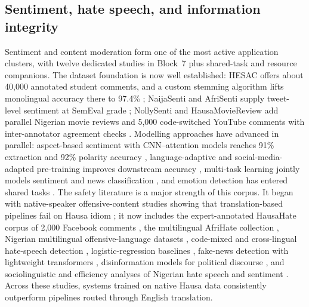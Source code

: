 \documentclass[sn-basic,pdflatex]{sn-jnl}
\begin{document}
\subsection{Sentiment, hate speech, and information integrity}
Sentiment and content moderation form one of the most active application clusters, with twelve dedicated studies in Block~7 plus shared-task and resource companions. The dataset foundation is now well established: HESAC offers about 40{,}000 annotated student comments, and a custom stemming algorithm lifts monolingual accuracy there to 97.4\% \citep{p054}; NaijaSenti and AfriSenti supply tweet-level sentiment at SemEval grade \citep{p110,p111,p056}; NollySenti and HausaMovieReview add parallel Nigerian movie reviews and 5{,}000 code-switched YouTube comments with inter-annotator agreement checks \citep{p132,p073}. Modelling approaches have advanced in parallel: aspect-based sentiment with CNN--attention models reaches 91\% extraction and 92\% polarity accuracy \citep{p063}, language-adaptive and social-media-adapted pre-training improves downstream accuracy \citep{p064,p072}, multi-task learning jointly models sentiment and news classification \citep{p151}, and emotion detection has entered shared tasks \citep{p065}. The safety literature is a major strength of this corpus. It began with native-speaker offensive-content studies showing that translation-based pipelines fail on Hausa idiom \citep{p058,p134}; it now includes the expert-annotated HausaHate corpus of 2{,}000 Facebook comments \citep{p059}, the multilingual AfriHate collection \citep{p071}, Nigerian multilingual offensive-language datasets \citep{p139}, code-mixed and cross-lingual hate-speech detection \citep{p135,p140}, logistic-regression baselines \citep{p138}, fake-news detection with lightweight transformers \citep{p136}, disinformation models for political discourse \citep{p137}, and sociolinguistic and efficiency analyses of Nigerian hate speech and sentiment \citep{p141,p142}. Across these studies, systems trained on native Hausa data consistently outperform pipelines routed through English translation.
\end{document}
